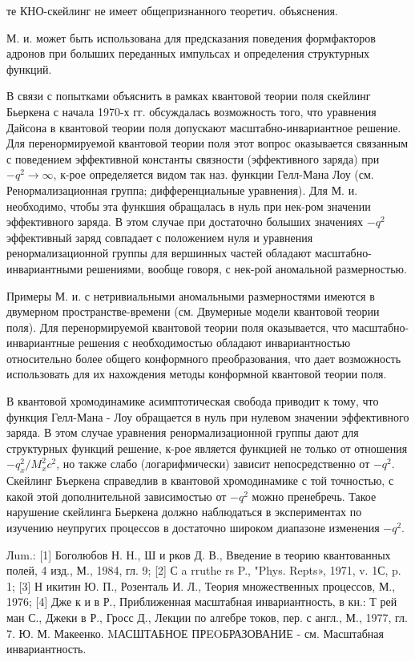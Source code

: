 \documentclass[10pt]{article}
\begin{document}
те КНО-скейлинг не имеет общепризнанного теоретич. объяснения.



М. и. может быть использована для предсказания поведения формфакторов адронов при болыших переданных импульсах и определения структурных функций.



В связи с попытками объяснить в рамках квантовой теории поля скейлинг Бьеркена с начала 1970-х гг. обсуждалась возможность того, что уравнения Дайсона в квантовой теории поля допускают масштабно-инвариантное решение. Для перенормируемой квантовой теории поля этот вопрос оказывается связанным с поведением эффективной константы связности (эффективного заряда) при $-q^{2} \rightarrow \infty$, к-рое определяется видом так наз. функции Гелл-Мана Лоу (см. Ренормализационная группа; дифференциальные уравнения). Для М. и. необходимо, чтобы эта функшия обращалась в нуль при нек-ром значении эффективного заряда. В этом случае при достаточно болыших значениях $-q^{2}$ эффективный заряд совпадает с положением нуля и уравнения ренормализационной группы для вершинных частей обладают масштабно-инвариантными решениями, вообще говоря, с нек-рой аномальной размерностью.



Примеры М. и. с нетривиальными аномальными размерностями имеются в двумерном пространстве-времени (см. Двумерные модели квантовой теории поля). Для перенормируемой квантовой теории поля оказывается, что масштабно-инвариантные решения с необходимостью обладают инвариантностью относительно более общего конформного преобразования, что дает возможность использовать для их нахождения методы конформной квантовой теории поля.



В квантовой хромодинамике асимптотическая свобода приводит к тому, что функция Гелл-Мана - Лоу обращается в нуль при нулевом значении эффективного заряда. В этом случае уравнения ренормализационной группы дают для структурных функций решение, к-рое является функцией не только от отношения $-q_{x}^{2} / M_{x}^{2} c^{2}$, но также слабо (логарифмически) зависит непосредственно от $-q^{2}$. Скейлинг Бъеркена справедлив в квантовой хромодинамике с той точностью, с какой этой дополнительной зависимостью от $-q^{2}$ можно пренебречь. Такое нарушение скейлинга Бьеркена должно наблюдаться в экспериментах по изучению неупругих процессов в достаточно широком диапазоне изменения $-q^{2}$.



Лum.: [1] Боголюбов Н. Н., Ш и рков Д. В., Введение в теорию квантованных полей, 4 изд., М., 1984, гл. 9; [2] С a rruthe rs P., "Phys. Repts», 1971, v. 1С, p. 1; [3] Н икитин Ю. П., Розенталь И. Л., Теория множественных процессов, М., 1976; [4] Дже к и в Р., Приближенная масштабная инвариантность, в кн.: Т рей ман С., Джеки в Р., Гросс Д., Лекции по алгебре токов, пер. с англ., М., 1977, гл. 7. Ю. М. Макеенко. MАСШТАБНОЕ ПРEOБРАЗОВАНИЕ - см. Масштабная инвариантность.
\end{document}
